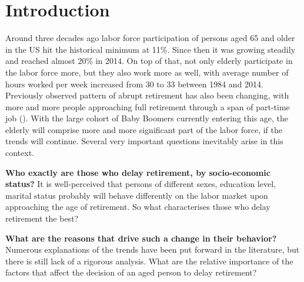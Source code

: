 \documentclass[
10pt, %
a4paper, %
oneside, %
headinclude,footinclude, %
BCOR5mm, %
]{scrartcl}
\begin{document}

{\let\thefootnote\relax{}}



\newpage %


\section{Introduction}
Around three decades ago labor force participation of persons aged 65 and older in the US hit the historical minimum at 11\%. Since then it was growing steadily and reached almost 20\% in 2014. On top of that, not only elderly participate in the labor force more, but they also work more as well, with average number of hours worked per week increased from 30 to 33 between 1984 and 2014. Previously observed pattern of abrupt retirement has also been changing, with more and more people approaching full retirement through a span of part-time job (\cite{Rupert2015}). With the large cohort of Baby Boomers currently entering this age, the elderly will comprise more and more significant part of the labor force, if the trends will continue. Several very important questions inevitably arise in this context. 

\textbf{Who exactly are those who delay retirement, by socio-economic status?} It is well-perceived that persons of different sexes, education level, marital status probably will behave differently on the labor market upon approaching the age of retirement. So what characterises those who delay retirement the best?

\textbf{What are the reasons that drive such a change in their behavior?} Numerous explanations of the trends have been put forward in the literature, but there is still lack of a rigorous analysis. What are the relative importance of the factors that affect the decision of an aged person to delay retirement?
\end{document}
